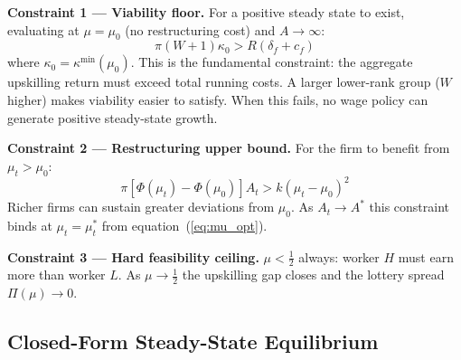 \documentclass[12pt,a4paper]{article}
\begin{document}
\textbf{Constraint 1 --- Viability floor.} For a positive steady state
to exist, evaluating at $\mu = \mu_0$ (no restructuring cost) and
$A \to \infty$:
\begin{equation}
  \boxed{\pi(W+1)\kappa_0 > R(\delta_f + c_f)}
  \label{eq:viability}
\end{equation}
where $\kappa_0 = \kappa^{\min}(\mu_0)$. This is the fundamental
constraint: the aggregate upskilling return must exceed total running
costs. A larger lower-rank group ($W$ higher) makes viability easier
to satisfy. When this fails, no wage policy can generate positive
steady-state growth.

\textbf{Constraint 2 --- Restructuring upper bound.} For the firm to
benefit from $\mu_t > \mu_0$:
\begin{equation}
  \pi[\Phi(\mu_t)-\Phi(\mu_0)]A_t > k(\mu_t-\mu_0)^2
  \label{eq:upper_bound}
\end{equation}
Richer firms can sustain greater deviations from $\mu_0$. As
$A_t \to A^*$ this constraint binds at $\mu_t = \mu_t^*$ from
equation~(\ref{eq:mu_opt}).

\textbf{Constraint 3 --- Hard feasibility ceiling.} $\mu < \tfrac{1}{2}$
always: worker $H$ must earn more than worker $L$. As $\mu \to
\tfrac{1}{2}$ the upskilling gap closes and the lottery spread
$\Pi(\mu) \to 0$.

\subsection{Closed-Form Steady-State Equilibrium}
\end{document}
